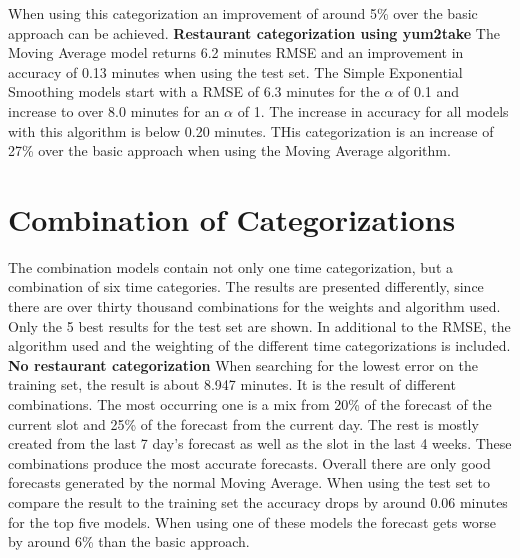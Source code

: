 When using this categorization an improvement of around 5\% over the basic approach can be achieved.
\newline\newline\textbf{Restaurant categorization using yum2take}\newline
The Moving Average model returns 6.2 minutes RMSE and an improvement in accuracy of 0.13 minutes when using the test set. The Simple Exponential Smoothing models start with a RMSE of 6.3 minutes for the $\alpha$ of 0.1 and increase to over 8.0 minutes for an $\alpha$ of 1. The increase in accuracy for all models with this algorithm is below 0.20 minutes.\newline
THis categorization is an increase of 27\% over the basic approach when using the Moving Average algorithm.
\section{Combination of Categorizations}\label{section:Combination of Categorizations}
The combination models contain not only one time categorization, but a combination of six time categories.
The results are presented differently, since there are over thirty thousand combinations for the weights and algorithm used. Only the 5 best results for the test set are shown. In additional to the RMSE, the algorithm used and the weighting of the different time categorizations is included.
\newline\newline\textbf{No restaurant categorization}\newline
When searching for the lowest error on the training set, the result is about 8.947 minutes. It is the result of different combinations. The most occurring one is a mix from 20\% of the forecast of the current slot and 25\% of the forecast from the current day. The rest is mostly created from the last 7 day's forecast as well as the slot in the last 4 weeks. These combinations produce the most accurate forecasts. Overall there are only good forecasts generated by the normal Moving Average. When using the test set to compare the result to the training set the accuracy drops by around 0.06 minutes for the top five models.\newline
When using one of these models the forecast gets worse by around 6\% than the basic approach.

